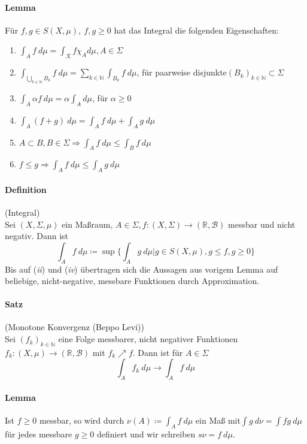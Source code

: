\documentclass[12pt,a4paper,fleqn]{article}
\begin{document}
\paragraph{Lemma} Für $f, g \in S(X, \mu),\ f, g \geq 0$ hat das Integral die folgenden Eigenschaften:
\begin{enumerate}
\item$\int_A f\ d\mu = \int_X f \chi_A d\mu, A \in \Sigma$
\item$\int_{\bigcup_{k \in \mathbb{N}}B_k}f\ d\mu = \sum_{k \in \mathbb{N}} \int_{B_k} f\ d\mu$, für paarweise disjunkte$(B_k)_{k \in \mathbb{N}} \subset \Sigma$
\item$\int_A \alpha f\ d\mu = \alpha \int_A d\mu$, für $\alpha \geq 0$
\item$\int_A (f + g)\ d\mu = \int_A f\ d\mu + \int_A g\ d\mu$
\item$A \subset B, B \in \Sigma \Rightarrow \int_A f\ d\mu \leq \int_B f\ d\mu$
\item$f \leq g \Rightarrow \int_A f\ d\mu \leq \int_A g\ d\mu$
\end{enumerate}

\paragraph{Definition} (Integral)\\
Sei $(X, \Sigma, \mu)$ ein Maßraum, $A \in \Sigma, f\colon (X, \Sigma) \rightarrow (\mathbb{R}, \mathcal{B})$ messbar und nicht negativ. Dann ist 
\begin{displaymath}
\int_A f\ d\mu \coloneqq \sup \{\int_A g\ d\mu \vert g \in S(X, \mu), g \leq f, g \geq 0 \}
\end{displaymath}
Bis auf (\textit{ii}) und (\textit{iv}) übertragen sich die Aussagen aus vorigem Lemma auf beliebige, nicht-negative, messbare Funktionen durch Approximation.

\paragraph{Satz} (Monotone Konvergenz (Beppo Levi))\\
Sei $(f_k)_{k \in \mathbb{N}}$ eine Folge messbarer, nicht negativer Funktionen $f_k: (X, \mu) \rightarrow (\mathbb{R}, \mathcal{B})$ mit $f_k \nearrow f$. Dann ist für $A \in \Sigma$
\begin{displaymath}
\int_A f_k\ d\mu \rightarrow \int_A f\ d\mu 
\end{displaymath}

\paragraph{Lemma} Ist $f \geq 0$ messbar, so wird durch $\nu(A) \coloneqq \int_A f\ d\mu$ ein Maß mit\linebreak ${\int g\ d\nu = \int fg\ d\mu}$ für jedes messbare $g \geq 0$ definiert und wir schreiben $s\nu = f\ d\mu$.
\end{document}
